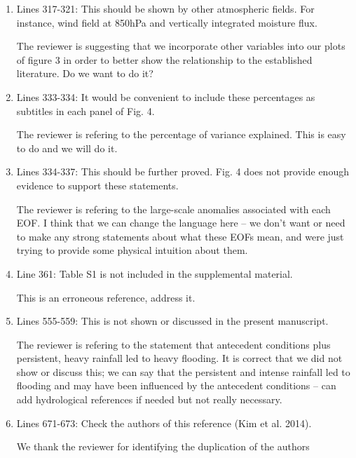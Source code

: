 \documentclass{article}
\newenvironment{answer}{\begin{mdframed}}{\end{mdframed}}
\begin{document}
\begin{enumerate}
	\item Lines 317-321: This should be shown by other atmospheric fields. For instance, wind field at 850hPa and vertically integrated moisture flux.
	\begin{answer}
		The reviewer is suggesting that we incorporate other variables into our plots of figure 3 in order to better show the relationship to the established literature.
		Do we want to do it?
	\end{answer}
	\item Lines 333-334: It would be convenient to include these percentages as subtitles in each panel of Fig. 4.
	\begin{answer}
		The reviewer is refering to the percentage of variance explained.
		This is easy to do and we will do it.
	\end{answer}
	\item Lines 334-337: This should be further proved. Fig. 4 does not provide enough evidence to support these statements.
	\begin{answer}
		The reviewer is refering to the large-scale anomalies associated with each EOF.
		I think that we can change the language here -- we don't want or need to make any strong statements about what these EOFs mean, and were just trying to provide some physical intuition about them.
	\end{answer}
	\item Line 361: Table S1 is not included in the supplemental material.
	\begin{answer}
		This is an erroneous reference, address it.
	\end{answer}
	\item Lines 555-559: This is not shown or discussed in the present manuscript.
	\begin{answer}
		The reviewer is refering to the statement that antecedent conditions plus persistent, heavy rainfall led to heavy flooding.
		It is correct that we did not show or discuss this; we can say that the persistent and intense rainfall led to flooding and may have been influenced by the antecedent conditions -- can add hydrological references if needed but not really necessary.
	\end{answer}
	\item	Lines 671-673: Check the authors of this reference (Kim et al. 2014).
	\begin{answer}
		We thank the reviewer for identifying the duplication of the authors
	\end{answer}

\end{enumerate}
\end{document}
